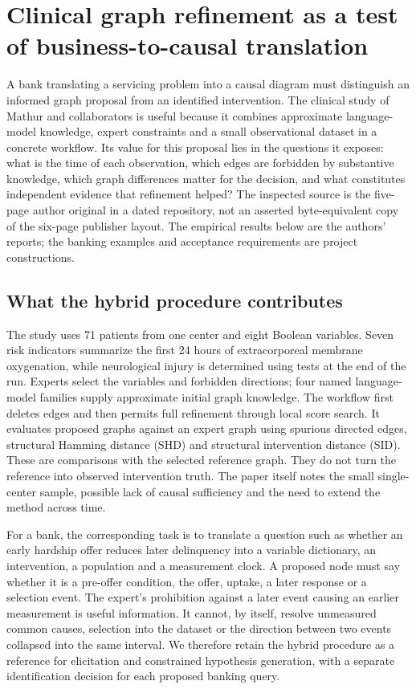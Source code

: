 
\section{Clinical graph refinement as a test of business-to-causal translation}
\label{sec:exec25-ecmo}
A bank translating a servicing problem into a causal diagram must distinguish
an informed graph proposal from an identified intervention. The clinical study
of Mathur and collaborators is useful because it combines approximate language-model
knowledge, expert constraints and a small observational dataset in a concrete
workflow. Its value for this proposal lies in the questions it exposes: what is
the time of each observation, which edges are forbidden by substantive knowledge,
which graph differences matter for the decision, and what constitutes independent
evidence that refinement helped? The inspected source is the five-page author
original in a dated repository, not an asserted byte-equivalent copy of the
six-page publisher layout. The empirical results below are the authors' reports;
the banking examples and acceptance requirements are project constructions.
\citep{exec24_ecmo_original,exec24_ecmo_reference}

\subsection{What the hybrid procedure contributes}
The study uses 71 patients from one center and eight Boolean variables. Seven
risk indicators summarize the first 24 hours of extracorporeal membrane
oxygenation, while neurological injury is determined using tests at the end of
the run. Experts select the variables and forbidden directions; four named
language-model families supply approximate initial graph knowledge. The workflow
first deletes edges and then permits full refinement through local score search.
It evaluates proposed graphs against an expert graph using spurious directed
edges, structural Hamming distance (SHD) and structural intervention distance
(SID). These are comparisons with the selected reference graph. They do not
turn the reference into observed intervention truth. The paper itself notes
the small single-center sample, possible lack of causal sufficiency and the need
to extend the method across time.\citep{exec24_ecmo_original}

For a bank, the corresponding task is to translate a question such as whether
an early hardship offer reduces later delinquency into a variable dictionary,
an intervention, a population and a measurement clock. A proposed node must say
whether it is a pre-offer condition, the offer, uptake, a later response or a
selection event. The expert's prohibition against a later event causing an
earlier measurement is useful information. It cannot, by itself, resolve
unmeasured common causes, selection into the dataset or the direction between
two events collapsed into the same interval. We therefore retain the hybrid
procedure as a reference for elicitation and constrained hypothesis generation,
with a separate identification decision for each proposed banking query.
\citep{exec24_ecmo_reference}


